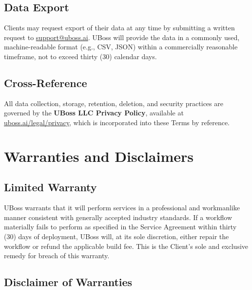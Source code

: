 \documentclass[11pt,letterpaper,parskip=half]{scrartcl}
\begin{document}
\subsection{Data Export}

Clients may request export of their data at any time by submitting a written request to \href{mailto:support@uboss.ai}{support@uboss.ai}. UBoss will provide the data in a commonly used, machine-readable format (e.g., CSV, JSON) within a commercially reasonable timeframe, not to exceed thirty (30) calendar days.

\subsection{Cross-Reference}

All data collection, storage, retention, deletion, and security practices are governed by the \textbf{UBoss LLC Privacy Policy}, available at \href{https://uboss.ai/en/legal/privacy}{uboss.ai/legal/privacy}, which is incorporated into these Terms by reference.

\section{Warranties and Disclaimers}

\subsection{Limited Warranty}

UBoss warrants that it will perform services in a professional and workmanlike manner consistent with generally accepted industry standards. If a workflow materially fails to perform as specified in the Service Agreement within thirty (30) days of deployment, UBoss will, at its sole discretion, either repair the workflow or refund the applicable build fee. This is the Client's sole and exclusive remedy for breach of this warranty.

\subsection{Disclaimer of Warranties}
\end{document}
